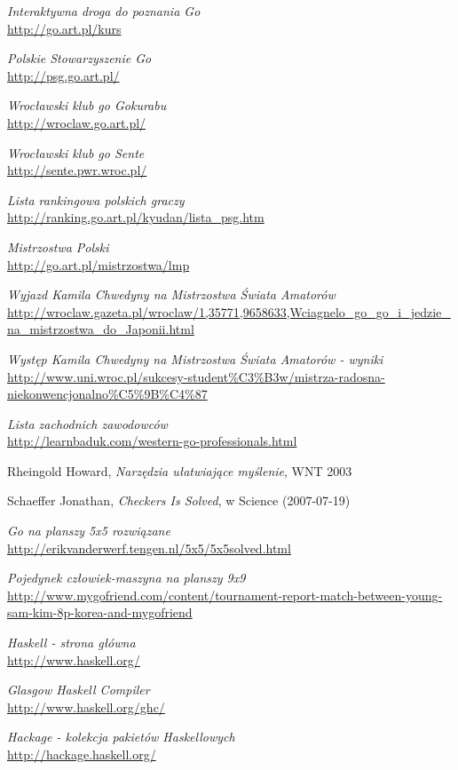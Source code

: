 \documentclass[11pt,leqno]{article}
\begin{document}
\begin{thebibliography}{9}

  \emph{Interaktywna droga do poznania Go} \\
  \url{http://go.art.pl/kurs}

  \emph{Polskie Stowarzyszenie Go} \\
  \url{http://psg.go.art.pl/}

  \emph{Wrocławski klub go Gokurabu} \\
  \url{http://wroclaw.go.art.pl/}

  \emph{Wrocławski klub go Sente} \\
  \url{http://sente.pwr.wroc.pl/}

  \emph{Lista rankingowa polskich graczy} \\
  \url{http://ranking.go.art.pl/kyudan/lista\_psg.htm}

  \emph{Mistrzostwa Polski} \\
  \url{http://go.art.pl/mistrzostwa/lmp}

  \emph{Wyjazd Kamila Chwedyny na Mistrzostwa Świata Amatorów} \\
  \url{http://wroclaw.gazeta.pl/wroclaw/1,35771,9658633,Wciagnelo_go_go_i_jedzie_na_mistrzostwa_do_Japonii.html}

  \emph{Występ Kamila Chwedyny na Mistrzostwa Świata Amatorów - wyniki} \\
  \url{http://www.uni.wroc.pl/sukcesy-student%C3%B3w/mistrza-radosna-niekonwencjonalno%C5%9B%C4%87}

  \emph{Lista zachodnich zawodowców} \\
  \url{http://learnbaduk.com/western-go-professionals.html}

  Rheingold Howard, \emph{Narzędzia ułatwiające myślenie}, WNT 2003

  Schaeffer Jonathan, \emph{Checkers Is Solved}, w Science (2007-07-19)

  \emph{Go na planszy 5x5 rozwiązane} \\
  \url{http://erikvanderwerf.tengen.nl/5x5/5x5solved.html}

  \emph{Pojedynek człowiek-maszyna na planszy 9x9}
  \url{http://www.mygofriend.com/content/tournament-report-match-between-young-sam-kim-8p-korea-and-mygofriend}

  \emph{Haskell - strona główna} \\
  \url{http://www.haskell.org/}

  \emph{Glasgow Haskell Compiler} \\
  \url{http://www.haskell.org/ghc/}

  \emph{Hackage - kolekcja pakietów Haskellowych} \\
  \url{http://hackage.haskell.org/}

\end{thebibliography}
\end{document}
